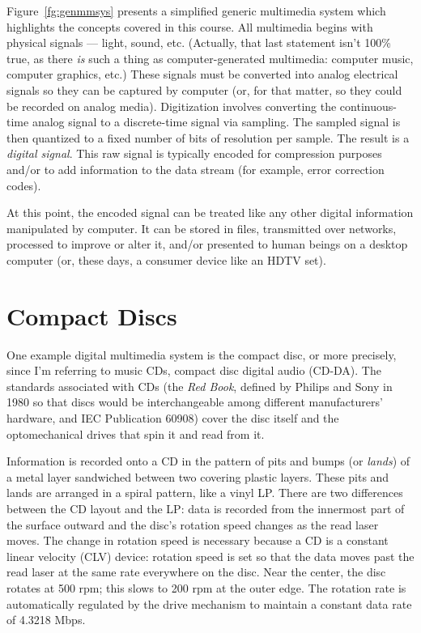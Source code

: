 Figure~\ref{fg:genmmsys} presents a simplified generic multimedia
system which highlights the concepts covered in this course. All
multimedia begins with physical signals --- light, sound,
etc. (Actually, that last statement isn't 100\% true, as there
\emph{is} such a thing as computer-generated multimedia: computer
music, computer graphics, etc.) These signals must be converted into
analog electrical signals so they can be captured by computer (or, for
that matter, so they could be recorded on analog media).  Digitization
involves converting the continuous-time analog signal to a
discrete-time signal via sampling. The sampled signal is then
quantized to a fixed number of bits of resolution per sample.  The
result is a \emph{digital signal}. This raw signal is typically
encoded for compression purposes and/or to add information to the data
stream (for example, error correction codes).

At this point, the encoded signal can be treated like any other
digital information manipulated by computer. It can be stored in
files, transmitted over networks, processed to improve or alter it,
and/or presented to human beings on a desktop computer (or, these
days, a consumer device like an HDTV set).

\section{Compact Discs}

One example digital multimedia system is the compact disc, or more
precisely, since I'm referring to music CDs, compact disc digital
audio (CD-DA). The standards associated with CDs (the \textit{Red
Book}, defined by Philips and Sony in 1980 so that discs would be
interchangeable among different manufacturers' hardware, and IEC
Publication 60908) cover the disc itself and the optomechanical drives
that spin it and read from it.

Information is recorded onto a CD in the pattern of pits and bumps (or
\emph{lands}) of a metal layer sandwiched between two covering plastic
layers.  These pits and lands are arranged in a spiral pattern, like a
vinyl LP. There are two differences between the CD layout and the LP:
data is recorded from the innermost part of the surface outward and
the disc's rotation speed changes as the read laser moves. The change
in rotation speed is necessary because a CD is a constant linear
velocity (CLV) device: rotation speed is set so that the data moves
past the read laser at the same rate everywhere on the disc. Near the
center, the disc rotates at 500 rpm; this slows to 200 rpm at the
outer edge. The rotation rate is automatically regulated by the drive
mechanism to maintain a constant data rate of 4.3218 Mbps.

